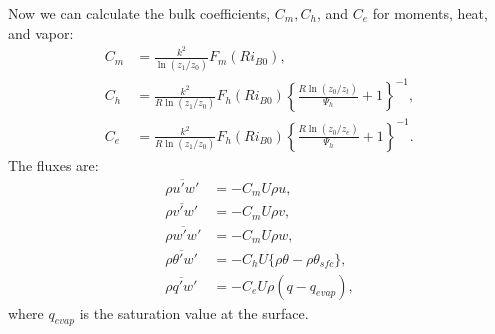 Now we can calculate the bulk coefficients, $C_m, C_h$, and $C_e$ for moments, heat, and vapor:
\begin{align}
  C_m &= \frac{k^2}{\ln(z_1/z_0)}F_m(Ri_{B0}), \\
  C_h &= \frac{k^2}{R\ln(z_1/z_0)}F_h(Ri_{B0})\left\{\frac{R\ln(z_0/z_t)}{\Psi_h}+1\right\}^{-1}, \\
  C_e &= \frac{k^2}{R\ln(z_1/z_0)}F_h(Ri_{B0})\left\{\frac{R\ln(z_0/z_e)}{\Psi_h}+1\right\}^{-1}.
\end{align}
The fluxes are:
\begin{align}
  \overline{\rho u'w'} &= - C_m U \rho u, \\
  \overline{\rho v'w'} &= - C_m U \rho v, \\
  \overline{\rho w'w'} &= - C_m U \rho w, \\
  \overline{\rho \theta'w'} &= - C_h U \{\rho \theta - \rho \theta_{sfc}\}, \\
  \overline{\rho q'w'} &= -C_e U \rho ( q - q_{evap} ),
\end{align}
where $q_{evap}$ is the saturation value at the surface.


